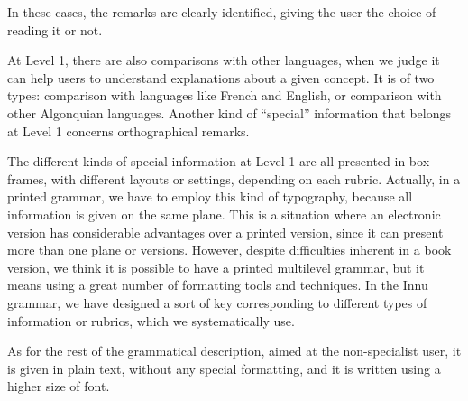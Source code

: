 In these cases, the remarks are clearly identified, giving the user the choice of reading it or not.

At Level 1, there are also comparisons with other languages, when we judge it can help users to understand explanations about a given concept. It is of two types: comparison with languages like French and English, or comparison with other Algonquian languages. Another kind of ``special'' information that belongs at Level 1 concerns orthographical remarks.

The different kinds of special information at Level 1 are all presented in box frames, with different layouts or settings, depending on each rubric. Actually, in a printed grammar, we have to employ this kind of typography, because all information is given on the same plane. This is a situation where an electronic version has considerable advantages over a printed version, since it can present more than one plane or versions. However, despite difficulties inherent in a book version, we think it is possible to have a printed multilevel grammar, but it means using a great number of formatting tools and techniques. In the Innu grammar, we have designed a sort of key corresponding to different types of information or rubrics, which we systematically use.

As for the rest of the grammatical description, aimed at the non-specialist user, it is given in plain text, without any special formatting, and it is written using a higher size of font.

